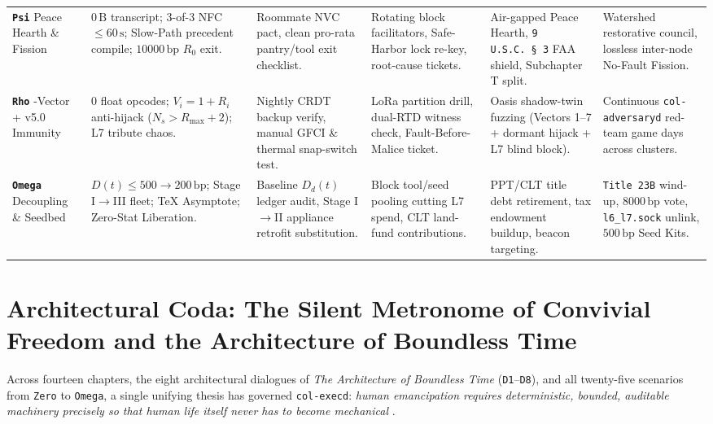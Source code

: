 \begin{table}[htbp]
{\begin{tabular}{@{}p{1.4cm}p{2.7cm}p{2.55cm}p{2.55cm}p{2.65cm}p{2.65cm}@{}}
\textbf{\texttt{Psi}} \newline Peace Hearth \& Fission & $0\,\mathrm{B}$ transcript; 3-of-3 NFC $\le 60\,\mathrm{s}$; Slow-Path precedent compile; $10000\,\mathrm{bp}$ $R_0$ exit. & Roommate NVC pact, clean pro-rata pantry/tool exit checklist. & Rotating block facilitators, Safe-Harbor lock re-key, root-cause tickets. & Air-gapped Peace Hearth, \texttt{9 U.S.C.\ \S~3} FAA shield, Subchapter T split. & Watershed restorative council, lossless inter-node No-Fault Fission. \\
\addlinespace[4pt]
\textbf{\texttt{Rho}} \newline 7-Vector + v5.0 Immunity & $0$ float opcodes; $V_i=1+R_i$ anti-hijack ($N_s>R_{\max}+2$); L7 tribute chaos. & Nightly CRDT backup verify, manual GFCI \& thermal snap-switch test. & LoRa partition drill, dual-RTD witness check, Fault-Before-Malice ticket. & Oasis shadow-twin fuzzing (Vectors 1--7 + dormant hijack + L7 blind block). & Continuous \texttt{col-adversaryd} red-team game days across clusters. \\
\addlinespace[4pt]
\textbf{\texttt{Omega}} \newline Decoupling \& Seedbed & $D(t) \le 500 \to 200\,\mathrm{bp}$; Stage I$\to$III fleet; TeX Asymptote; Zero-Stat Liberation. & Baseline $D_d(t)$ ledger audit, Stage I$\to$II appliance retrofit substitution. & Block tool/seed pooling cutting L7 spend, CLT land-fund contributions. & PPT/CLT title debt retirement, tax endowment buildup, beacon targeting. & \texttt{Title 23B} wind-up, $8000\,\mathrm{bp}$ vote, \texttt{l6\_l7.sock} unlink, $500\,\mathrm{bp}$ Seed Kits. \\
\bottomrule
\end{tabular}%
}
\end{table}

\section{Architectural Coda: The Silent Metronome of Convivial Freedom and the Architecture of Boundless Time}
\label{sec:layer4-coda}

Across fourteen chapters, the eight architectural dialogues of \textit{The Architecture of Boundless Time} (\texttt{D1}--\texttt{D8}), and all twenty-five
scenarios from \texttt{Zero} to \texttt{Omega}, a single unifying thesis has governed \texttt{col-execd}: \emph{human emancipation requires deterministic,
bounded, auditable machinery precisely so that human life itself never has to become mechanical} \parencite{wiener1954,weiser1996calm,illich1973}.

